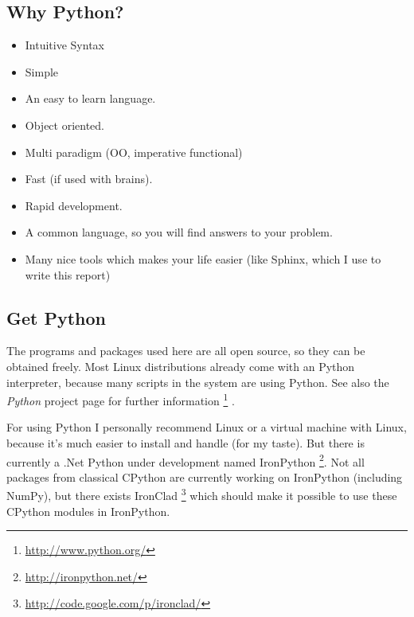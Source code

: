 \documentclass[letterpaper,10pt,english]{manual}
\begin{document}
\subsection{Why Python?}
\begin{itemize}
\item {} 
Intuitive Syntax

\item {} 
Simple

\item {} 
An easy to learn language.

\item {} 
Object oriented.

\item {} 
Multi paradigm (OO, imperative functional)

\item {} 
Fast (if used with brains).

\item {} 
Rapid development.

\item {} 
A common language, so you will find answers to your problem.

\item {} 
Many nice tools which makes your life easier (like Sphinx, which I use to write this report)

\end{itemize}


\subsection{Get Python}

The programs and packages used here are all open source, so they can be obtained freely.
Most Linux distributions already come with an Python interpreter,
because many scripts in the system are using Python.
See also the \emph{Python} project page for further information \footnote{
\href{http://www.python.org/}{http://www.python.org/}
} .

For using Python I personally recommend Linux or a virtual machine
with Linux, because it's much easier to install and handle (for my taste).
But there is currently a .Net Python under development named
IronPython \footnote{
\href{http://ironpython.net/}{http://ironpython.net/}
}.
Not all packages from classical CPython are currently working on IronPython
(including NumPy), but there exists IronClad \footnote{
\href{http://code.google.com/p/ironclad/}{http://code.google.com/p/ironclad/}
} which should make it
possible to use these CPython modules in IronPython.
\end{document}

